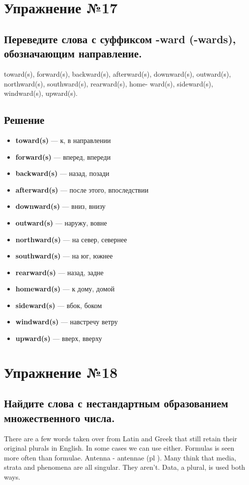 \section{Упражнение №17}
\subsection*{Переведите слова с суффиксом -ward (-wards), обозначающим направление.}
toward(s), forward(s), backward(s), afterward(s), downward(s),
outward(s), northward(s), southward(s), rearward(s), home-
ward(s), sideward(s), windward(s), upward(s).

\subsection*{Решение}
\begin{itemize}
      \item \textbf{toward(s)} --- к, в направлении
      \item \textbf{forward(s)} --- вперед, впереди
      \item \textbf{backward(s)} --- назад, позади
      \item \textbf{afterward(s)} --- после этого, впоследствии
      \item \textbf{downward(s)} --- вниз, внизу
      \item \textbf{outward(s)} --- наружу, вовне
      \item \textbf{northward(s)} --- на север, севернее
      \item \textbf{southward(s)} --- на юг, южнее
      \item \textbf{rearward(s)} --- назад, задне
      \item \textbf{homeward(s)} --- к дому, домой
      \item \textbf{sideward(s)} --- вбок, боком
      \item \textbf{windward(s)} --- навстречу ветру
      \item \textbf{upward(s)} --- вверх, вверху
\end{itemize}

\section{Упражнение №18}
\subsection*{Найдите слова с нестандартным образованием множественного числа.}
There are a few words taken over from Latin and Greek that
still retain their original plurals in English. In some cases we can
use either. Formulas is seen more often than formulae. Antenna -
antennae (pl ). Many think that media, strata and phenomena are
all singular. They aren't. Data, a plural, is used both ways.


